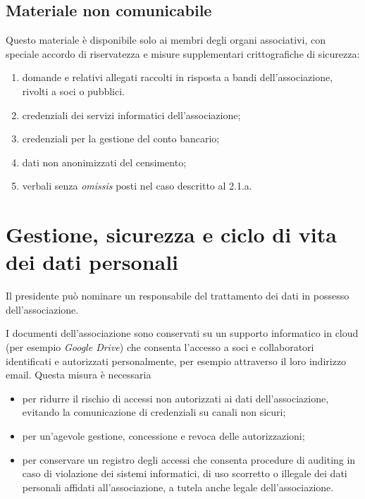 \subsection{Materiale non comunicabile}\label{materiale-non-comunicabile}

Questo materiale è disponibile solo ai membri degli organi associativi,
con speciale accordo di riservatezza e misure supplementari
crittografiche di sicurezza:

\begin{enumerate}
    \item
        domande e relativi allegati raccolti in risposta a bandi
        dell'associazione, rivolti a soci o pubblici.
    \item
        credenziali dei servizi informatici dell'associazione;
    \item
        credenziali per la gestione del conto bancario;
    \item
        dati non anonimizzati del censimento;
    \item
        verbali senza \emph{omissis} posti nel caso descritto al 2.1.a.
\end{enumerate}

\section{Gestione, sicurezza e ciclo di vita dei dati personali}

Il presidente può nominare un responsabile del trattamento dei dati in possesso
dell'associazione.

I documenti dell'associazione sono conservati su un supporto informatico in
cloud (per esempio \emph{Google Drive}) che consenta l'accesso a soci e
collaboratori identificati e autorizzati personalmente, per esempio
attraverso il loro indirizzo email.
Questa misura è necessaria 
\begin{itemize}
    \item per ridurre il rischio di accessi non
autorizzati ai dati dell'associazione, evitando la comunicazione di
credenziali su canali non sicuri;
\item per un'agevole gestione, concessione e revoca delle autorizzazioni;
\item per conservare un registro degli accessi che consenta procedure di
    auditing in caso di violazione dei sistemi informatici, di uso scorretto
    o illegale dei dati personali affidati all'associazione, a tutela anche
    legale dell'associazione.
\end{itemize}

